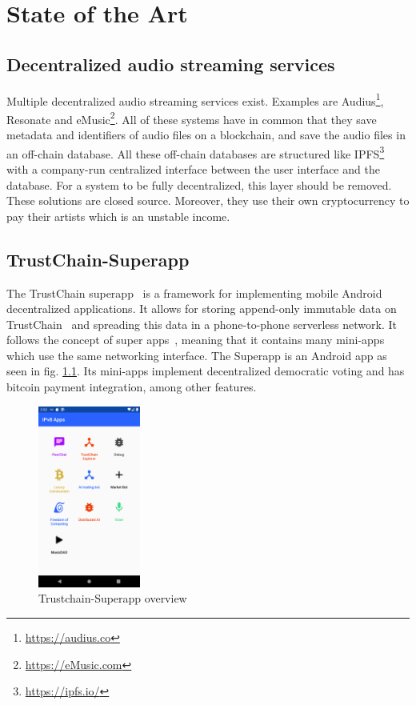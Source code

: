 \chapter{\label{chap:state-of-the-art}State of the Art}
\section{Decentralized audio streaming services}
Multiple decentralized audio streaming services exist. Examples are Audius\footnote{\url{https://audius.co}}, Resonate\cite{lindner2018investing} and eMusic\footnote{\url{https://eMusic.com}}. All of these systems have in common that they save metadata and identifiers of audio files on a blockchain, and save the audio files in an off-chain database. All these off-chain databases are structured like IPFS\footnote{\url{https://ipfs.io/}} with a company-run centralized interface between the user interface and the database. For a system to be fully decentralized, this layer should be removed. These solutions are closed source. Moreover, they use their own cryptocurrency to pay their artists which is an unstable income.

\section{TrustChain-Superapp}
\label{sec:sote-trustchain}
The TrustChain superapp~\citep{mattskala2020} is a framework for implementing mobile Android decentralized applications. It allows for storing append-only immutable data on TrustChain~\citep{otte2017trustchain} and spreading this data in a phone-to-phone serverless network. It follows the concept of super apps~\citep{kpmg2019superapps}, meaning that it contains many mini-apps which use the same networking interface. The Superapp is an Android app as seen in fig. \ref{fig:trustchain-superapp}. Its mini-apps implement decentralized democratic voting and has bitcoin payment integration, among other features.


\begin{figure}
    \includegraphics[width=0.3\textwidth]{implementation/screenshot-superapp.png}
    \caption{Trustchain-Superapp overview}
    \label{fig:trustchain-superapp}
\end{figure}

